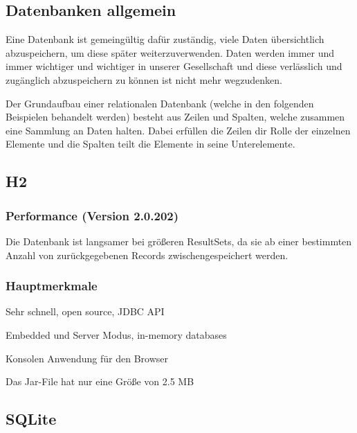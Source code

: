\subsection{Datenbanken allgemein}
Eine Datenbank ist gemeingültig dafür zuständig, viele Daten übersichtlich abzuspeichern, um diese später weiterzuverwenden. Daten werden immer und immer wichtiger und wichtiger in unserer Gesellschaft und diese verlässlich und zugänglich abzuspeichern zu können ist nicht mehr wegzudenken.

Der Grundaufbau einer relationalen Datenbank (welche in den folgenden Beispielen behandelt werden) besteht aus Zeilen und Spalten, welche zusammen eine Sammlung an Daten halten. Dabei erfüllen die Zeilen dir Rolle der einzelnen Elemente und die Spalten teilt die Elemente in seine Unterelemente. 


\subsection{H2}

\subsubsection{Performance (Version 2.0.202)}
Die Datenbank ist langsamer bei größeren ResultSets, da sie ab einer bestimmten Anzahl von zurückgegebenen Records zwischengespeichert werden.

\subsubsection{Hauptmerkmale}

\begin{compactitem}
    \item Sehr schnell, open source, JDBC API 
    \item Embedded und Server Modus, in-memory databases         
    \item Konsolen Anwendung für den Browser
    \item Das Jar-File hat nur eine Größe von 2.5 MB
\end{compactitem}

\subsection{SQLite}

